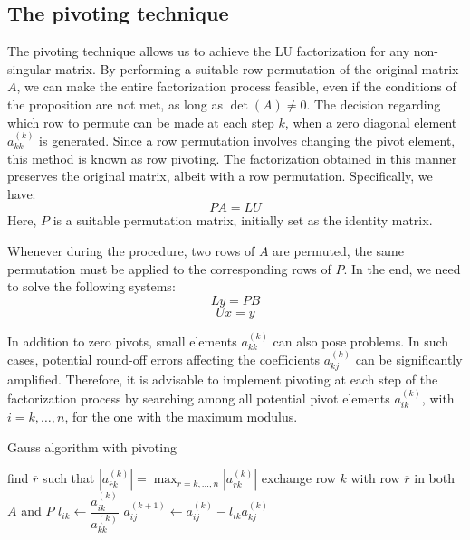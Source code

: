 \subsection*{The pivoting technique}
The pivoting technique allows us to achieve the LU factorization for any non-singular matrix.
By performing a suitable row permutation of the original matrix $A$, we can make the entire factorization process feasible, even if the conditions of the proposition are not met, as long as $\det(A) \neq 0$. 
The decision regarding which row to permute can be made at each step $k$, when a zero diagonal element $a_{kk}^{(k)}$ is generated.
Since a row permutation involves changing the pivot element, this method is known as row pivoting.
The factorization obtained in this manner preserves the original matrix, albeit with a row permutation. Specifically, we have:
\[PA=LU\]
Here, $P$ is a suitable permutation matrix, initially set as the identity matrix. 

Whenever during the procedure, two rows of $A$ are permuted, the same permutation must be applied to the corresponding rows of $P$.
In the end, we need to solve the following systems:
\[Ly=PB\]
\[Ux=y\]

In addition to zero pivots, small elements $a_{kk}^{(k)}$ can also pose problems.
In such cases, potential round-off errors affecting the coefficients $a_{kj}^{(k)}$ can be significantly amplified.
Therefore, it is advisable to implement pivoting at each step of the factorization process by searching among all potential pivot elements $a_{ik}^{(k)}$, with $i=k,\dots,n$, for the one with the maximum modulus.
\begin{algorithm}[H]
    \caption{Gauss algorithm with pivoting}
        \begin{algorithmic}[1]
                \State find $\overline{r}$ such that $\left\lvert a_{\overline{r}k}^{(k)} \right\rvert=\max_{r=k,\dots,n}\left\lvert a_{rk}^{(k)} \right\rvert$
                \State exchange row $k$ with row $\overline{r}$ in both $A$ and $P$
                    \State $l_{ik} \leftarrow \dfrac{a_{ik}^{(k)}}{a_{kk}^{(k)}}$
                        \State $a_{ij}^{(k+1)} \leftarrow a_{ij}^{(k)}-l_{ik}a_{kj}^{(k)}$
                    \EndFor
                \EndFor
            \EndFor
        \end{algorithmic}
\end{algorithm}

